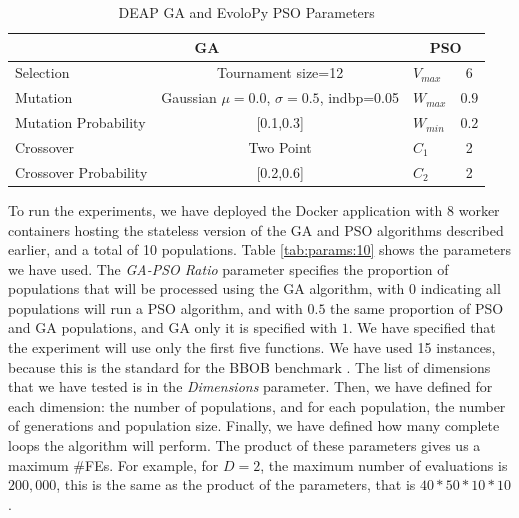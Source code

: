 \documentclass[runningheads]{llncs}
\begin{document}
\begin{table}
  \small
  \caption{ DEAP GA and EvoloPy PSO Parameters }
  \label{tab:GAparams} 
  \centering
  \small
  \begin{tabular}{|l|c||l|c|}
    \hline
    \multicolumn{2}{|c||}{GA} & \multicolumn{2}{c|}{PSO} \\ \hline
    Selection & Tournament size=12 &      $V_{max}$ & 6                  \\ \hline
    Mutation & Gaussian $\mu=0.0$, $\sigma=0.5$, indbp=0.05 & $W_{max}$ & $0.9$     \\ \hline
    Mutation Probability & [0.1,0.3] &   $W_{min}$ & $0.2$                      \\ \hline
    Crossover & Two Point   &       $C_1$ & 2                             \\ \hline
    Crossover Probability  & [0.2,0.6] & $C_2$ & 2  \\ \hline
  \end{tabular}
\end{table}

To run the experiments, we have deployed the Docker application with 8 worker
containers hosting the stateless version of the GA and PSO algorithms described
earlier, and a total of 10 populations. %
Table \ref{tab:params:10} shows the parameters we have used. The {\em
GA-PSO Ratio} parameter specifies the proportion of populations that
will be processed using the GA algorithm, with $0$ indicating all
populations will run a PSO algorithm, and with $0.5$ the same
proportion of PSO and GA populations, and GA only it is specified with
$1$. We have specified that the experiment will use only the first
five functions. We have used 15 instances, because this is the
standard for the BBOB benchmark \cite{hansen2016coco}.  The list of
dimensions that we have tested is in the {\em Dimensions} parameter.
Then, we have defined for each dimension: the number of populations,
and for each population, the number of generations and population
size. Finally, we have defined how many complete loops the algorithm
will perform. The product of these parameters gives us a maximum
\#FEs. For example, for $D = 2$, the maximum number of evaluations is
$200,000$, this is the same as the product of the parameters, that is
$40*50*10*10$.
\end{document}
